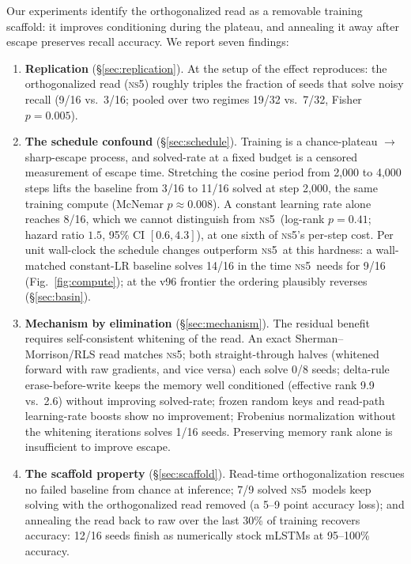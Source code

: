 \documentclass[11pt]{article}
\newcommand{\ns}{\textsc{ns5}}
\begin{document}
Our experiments identify the orthogonalized read as a removable training
scaffold: it improves conditioning during the plateau, and annealing it away
after escape preserves recall accuracy. We report seven findings:

\begin{enumerate}
\item \textbf{Replication} (\S\ref{sec:replication}). At the setup of
  \citet{tambde2026ortho} the effect reproduces: the orthogonalized read (\ns) roughly
  triples the fraction of
  seeds that solve noisy recall (9/16 vs.\ 3/16; pooled over two regimes 19/32
  vs.\ 7/32, Fisher $p=0.005$).
\item \textbf{The schedule confound} (\S\ref{sec:schedule}). Training is a
  chance-plateau $\to$ sharp-escape process, and solved-rate at a fixed budget is a
  censored measurement of escape time. Stretching the cosine period from 2{,}000 to
  4{,}000 steps lifts the baseline from 3/16 to 11/16 solved at step
  2{,}000, the same training compute (McNemar $p\approx0.008$). A constant
  learning rate alone reaches 8/16, which we cannot distinguish from \ns\
  (log-rank $p=0.41$; hazard ratio $1.5$, 95\% CI $[0.6, 4.3]$), at one sixth
  of \ns's per-step cost. Per unit wall-clock the schedule changes outperform
  \ns\ at this hardness: a wall-matched constant-LR baseline solves 14/16 in
  the time \ns\ needs for 9/16 (Fig.~\ref{fig:compute}); at the v96 frontier the
  ordering plausibly reverses (\S\ref{sec:basin}).
\item \textbf{Mechanism by elimination} (\S\ref{sec:mechanism}). The residual
  benefit requires self-consistent whitening of the read. An exact
  Sherman--Morrison/RLS read matches \ns; both straight-through halves (whitened
  forward with raw gradients, and vice versa) each solve 0/8 seeds; delta-rule
  erase-before-write keeps the memory well conditioned (effective rank 9.9
  vs.\ 2.6) without improving solved-rate; frozen random keys and read-path learning-rate
  boosts show no improvement; Frobenius normalization without the whitening iterations
  solves 1/16 seeds. Preserving memory rank alone is insufficient to
  improve escape.
\item \textbf{The scaffold property} (\S\ref{sec:scaffold}). Read-time
  orthogonalization rescues no failed baseline from chance at inference; 7/9 solved
  \ns\ models keep solving with the orthogonalized read removed (a 5--9 point accuracy loss);
  and annealing the read back to raw over the last 30\% of training recovers accuracy:
  12/16 seeds finish as numerically stock mLSTMs at 95--100\% accuracy.

\end{enumerate}
\end{document}
